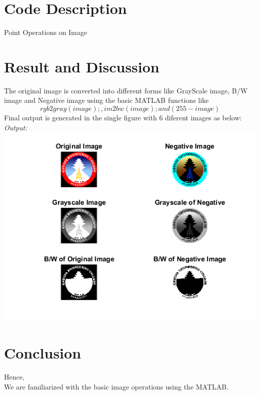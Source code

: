 \documentclass[12pt]{article}
\begin{document}
\section{Code Description}
Point Operations on Image \\






\pagebreak

\section{Result and Discussion}
The original image is converted into different forms like GrayScale image, B/W image and Negative image using the basic MATLAB functions like$$  rgb2gray(image); , im2bw(image); and (255 - image) $$
Final output is generated in the single figure with 6 diferent images as below:\\

\emph{Output:}\\

\includegraphics[scale =1.0]{output_labtwo_1.png}







\pagebreak

\section{Conclusion}
Hence, \\
We are familiarized with the  basic image operations using the MATLAB.
\end{document}

